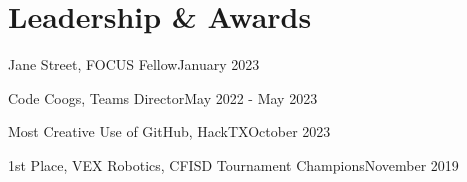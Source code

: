 \section{Leadership \& Awards}
\resumeSubHeadingListStart
    \AwardSubheading
    {Jane Street, FOCUS Fellow}{January 2023}

    \AwardSubheading
    {Code Coogs, Teams Director}{May 2022 - May 2023}

    \AwardSubheading
    {Most Creative Use of GitHub, HackTX}{October 2023}

    \AwardSubheading
    {1st Place, VEX Robotics, CFISD Tournament Champions}{November 2019}
\resumeSubHeadingListEnd
